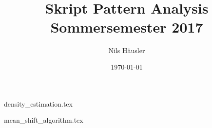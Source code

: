 \documentclass[12p]{article}
\title{Skript Pattern Analysis Sommersemester 2017}
\author{Nils Häusler}
\date{\today}
\begin{document}
\begin{titlepage}
  \maketitle
  \thispagestyle{empty}
\end{titlepage}

\newpage
{density_estimation.tex}

\newpage
{mean_shift_algorithm.tex}
\end{document}
